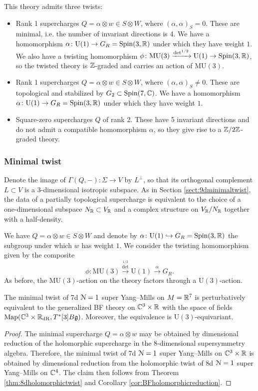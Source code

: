 \documentclass[10pt, oneside]{article}
\newcommand{\MU}{\mathrm{MU}}
\renewcommand{\U}{\mathrm{U}}
\begin{document}
This theory admits three twists:
\begin{itemize}
\item Rank 1 supercharges $Q=\alpha\otimes w\in S\otimes W$, where $(\alpha, \alpha)_S = 0$. These are minimal, i.e. the number of invariant directions is 4. We have a homomorphism $\alpha\colon \U(1)\rightarrow G_R=\Spin(3, \RR)$ under which they have weight $1$. We also have a twisting homomorphism $\phi\colon \MU(3)\xrightarrow{\det^{1/2}} \U(1)\rightarrow \Spin(3, \RR)$, so the twisted theory is $\mathbb Z$-graded and carries an action of $\MU(3)$.

\item Rank 1 supercharges $Q = \alpha \otimes w \in S \otimes W$, where $(\alpha, \alpha)_S\neq 0$. These are topological and stabilized by $G_2\subset \mathrm{Spin}(7, \mathbb C)$. We have a homomorphism $\alpha\colon \U(1)\rightarrow G_R=\Spin(3, \RR)$ under which they have weight $1$.

\item Square-zero supercharges $Q$ of rank 2. These have 5 invariant directions and do not admit a compatible homomorphism $\alpha$, so they give rise to a $\mathbb Z/2\mathbb Z$-graded theory.
\end{itemize}

\subsubsection{Minimal twist}

Denote the image of $\Gamma(Q, -)\colon \Sigma\rightarrow V$ by $L^\perp$, so that its orthogonal complement $L\subset V$ is a 3-dimensional isotropic subspace. As in Section \ref{sect:9dminimaltwist}, the data of a partially topological supercharge is equivalent to the choice of a one-dimensional subspace $N_\mathbb R\subset V_\mathbb R$ and a complex structure on $V_\mathbb R/N_\mathbb R$ together with a half-density.

We have $Q=\alpha\otimes w\in S\otimes W$ and denote by $\alpha\colon \U(1)\hookrightarrow G_R=\Spin(3, \RR)$ the subgroup under which $w$ has weight $1$. We consider the twisting homomorphism given by the composite
\[\phi\colon \MU(3)\xrightarrow{\det^{1/2}}\U(1)\xrightarrow{\alpha} G_R.\]
As before, the $\MU(3)$-action on the theory factors through a $\U(3)$-action.

\begin{thm}
The minimal twist of 7d $\mathcal N=1$ super Yang--Mills on $M=\mathbb R^7$ is perturbatively equivalent to the generalized BF theory on $\mathbb C^3\times \mathbb R$ with the space of fields $\operatorname{Map}(\mathbb C^3\times \mathbb R_{\mathrm{dR}}, T^*[3] B\mathfrak g)$. Moreover, the equivalence is $\U(3)$-equivariant.
\label{thm:7dminimaltwist}
\end{thm}
\begin{proof}
The minimal supercharge $Q=\alpha\otimes w$ may be obtained by dimensional reduction of the holomorphic supercharge in the 8-dimensional supersymmetry algebra. Therefore, the minimal twist of 7d $\mathcal N=1$ super Yang--Mills on $\mathbb C^3\times \mathbb R$ is obtained by dimensional reduction from the holomorphic twist of 8d $\mathcal N=1$ super Yang--Mills on $\mathbb C^4$. The claim then follows from Theorem \ref{thm:8dholomorphictwist} and Corollary \ref{cor:BFholomorphicreduction}.
\end{proof}
\end{document}
